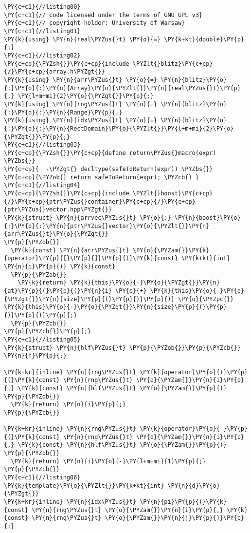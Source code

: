 \begin{Verbatim}[commandchars=\\\{\}]
\PY{c+c1}{//listing00}
\PY{c+c1}{// code licensed under the terms of GNU GPL v3}
\PY{c+c1}{// copyright holder: University of Warsaw}
\PY{c+c1}{//listing01}
\PY{k}{using} \PY{n}{real\PYZus{}t} \PY{o}{=} \PY{k+kt}{double}\PY{p}{;}
\PY{c+c1}{//listing02}
\PY{c+cp}{\PYZsh{}}\PY{c+cp}{include \PYZlt{}blitz}\PY{c+cp}{/}\PY{c+cp}{array.h\PYZgt{}}
\PY{k}{using} \PY{n}{arr\PYZus{}t} \PY{o}{=} \PY{n}{blitz}\PY{o}{:}\PY{o}{:}\PY{n}{Array}\PY{o}{\PYZlt{}}\PY{n}{real\PYZus{}t}\PY{p}{,} \PY{l+m+mi}{2}\PY{o}{\PYZgt{}}\PY{p}{;}
\PY{k}{using} \PY{n}{rng\PYZus{}t} \PY{o}{=} \PY{n}{blitz}\PY{o}{:}\PY{o}{:}\PY{n}{Range}\PY{p}{;}
\PY{k}{using} \PY{n}{idx\PYZus{}t} \PY{o}{=} \PY{n}{blitz}\PY{o}{:}\PY{o}{:}\PY{n}{RectDomain}\PY{o}{\PYZlt{}}\PY{l+m+mi}{2}\PY{o}{\PYZgt{}}\PY{p}{;}
\PY{c+c1}{//listing03}
\PY{c+cp}{\PYZsh{}}\PY{c+cp}{define return\PYZus{}macro(expr) \PYZbs{}}
\PY{c+cp}{  -\PYZgt{} decltype(safeToReturn(expr)) \PYZbs{}}
\PY{c+cp}{\PYZob{} return safeToReturn(expr); \PYZcb{} }
\PY{c+c1}{//listing04}
\PY{c+cp}{\PYZsh{}}\PY{c+cp}{include \PYZlt{}boost}\PY{c+cp}{/}\PY{c+cp}{ptr\PYZus{}container}\PY{c+cp}{/}\PY{c+cp}{ptr\PYZus{}vector.hpp\PYZgt{}}
\PY{k}{struct} \PY{n}{arrvec\PYZus{}t} \PY{o}{:} \PY{n}{boost}\PY{o}{:}\PY{o}{:}\PY{n}{ptr\PYZus{}vector}\PY{o}{\PYZlt{}}\PY{n}{arr\PYZus{}t}\PY{o}{\PYZgt{}} 
\PY{p}{\PYZob{}}
  \PY{k}{const} \PY{n}{arr\PYZus{}t} \PY{o}{\PYZam{}}\PY{k}{operator}\PY{p}{[}\PY{p}{]}\PY{p}{(}\PY{k}{const} \PY{k+kt}{int} \PY{n}{i}\PY{p}{)} \PY{k}{const} 
  \PY{p}{\PYZob{}}   
    \PY{k}{return} \PY{k}{this}\PY{o}{-}\PY{o}{\PYZgt{}}\PY{n}{at}\PY{p}{(}\PY{p}{(}\PY{n}{i} \PY{o}{+} \PY{k}{this}\PY{o}{-}\PY{o}{\PYZgt{}}\PY{n}{size}\PY{p}{(}\PY{p}{)}\PY{p}{)} \PY{o}{\PYZpc{}} \PY{k}{this}\PY{o}{-}\PY{o}{\PYZgt{}}\PY{n}{size}\PY{p}{(}\PY{p}{)}\PY{p}{)}\PY{p}{;} 
  \PY{p}{\PYZcb{}}
\PY{p}{\PYZcb{}}\PY{p}{;}
\PY{c+c1}{//listing05}
\PY{k}{struct} \PY{n}{hlf\PYZus{}t} \PY{p}{\PYZob{}}\PY{p}{\PYZcb{}} \PY{n}{h}\PY{p}{;}

\PY{k+kr}{inline} \PY{n}{rng\PYZus{}t} \PY{k}{operator}\PY{o}{+}\PY{p}{(}\PY{k}{const} \PY{n}{rng\PYZus{}t} \PY{o}{\PYZam{}}\PY{n}{i}\PY{p}{,} \PY{k}{const} \PY{n}{hlf\PYZus{}t} \PY{o}{\PYZam{}}\PY{p}{)} 
\PY{p}{\PYZob{}} 
  \PY{k}{return} \PY{n}{i}\PY{p}{;} 
\PY{p}{\PYZcb{}} 

\PY{k+kr}{inline} \PY{n}{rng\PYZus{}t} \PY{k}{operator}\PY{o}{-}\PY{p}{(}\PY{k}{const} \PY{n}{rng\PYZus{}t} \PY{o}{\PYZam{}}\PY{n}{i}\PY{p}{,} \PY{k}{const} \PY{n}{hlf\PYZus{}t} \PY{o}{\PYZam{}}\PY{p}{)} 
\PY{p}{\PYZob{}} 
  \PY{k}{return} \PY{n}{i}\PY{o}{-}\PY{l+m+mi}{1}\PY{p}{;} 
\PY{p}{\PYZcb{}}
\PY{c+c1}{//listing06}
\PY{k}{template}\PY{o}{\PYZlt{}}\PY{k+kt}{int} \PY{n}{d}\PY{o}{\PYZgt{}} 
\PY{k+kr}{inline} \PY{n}{idx\PYZus{}t} \PY{n}{pi}\PY{p}{(}\PY{k}{const} \PY{n}{rng\PYZus{}t} \PY{o}{\PYZam{}}\PY{n}{i}\PY{p}{,} \PY{k}{const} \PY{n}{rng\PYZus{}t} \PY{o}{\PYZam{}}\PY{n}{j}\PY{p}{)}\PY{p}{;}


\end{Verbatim}
